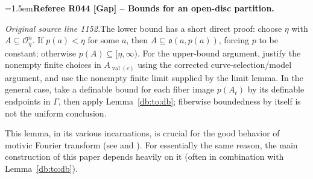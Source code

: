 \documentclass[12pt]{amsart}
\newcommand{\RefereeRemark}[4]{%
  \par\medskip\begingroup\normalfont\small\color{RefereePurple}%
  \emergencystretch=1.5em\noindent\textbf{Referee R#1 [#2] -- #3.}\par\nobreak\noindent #4\par
  \endgroup\medskip
}
\theoremstyle{plain}
\theoremstyle{definition}
\theoremstyle{remark}
\numberwithin{equation}{section}
\theoremstyle{plain}
\newcommand{\OO}{\mdl O}
\newcommand{\go}{\mathfrak{o}}
\newcommand{\0}{\emptyset}
\newcommand{\mdl}[1]{\mathcal{#1}}  %
\DeclareMathOperator{\vv}{val}
\begin{document}
\RefereeRemark{044}{Gap}{Bounds for an open-disc partition}{%
\textit{Original source line 1152.}\quad The lower bound has a short direct proof: choose $\eta$ with $A\subseteq\OO_\eta^n$. If $p(a)<\eta$ for some $a$, then $A\subseteq\go(a,p(a))$, forcing $p$ to be constant; otherwise $p(A)\subseteq[\eta,\infty)$. For the upper-bound argument, justify the nonempty finite choices in $A_{\vv(c)}$ using the corrected curve-selection/model argument, and use the nonempty finite limit supplied by the limit lemma. In the general case, take a definable bound for each fiber image $p(A_t)$ by its definable endpoints in $\Gamma$, then apply Lemma~\ref{db:to:db}; fiberwise boundedness by itself is not the uniform conclusion.
}

This lemma, in its various incarnations, is crucial for the good behavior of motivic Fourier transform (see \cite[\S~11]{hrushovski:kazhdan:integration:vf} and \cite{yin:hk:part:3}). For essentially the same reason, the  main construction of this paper depends heavily on  it (often in combination with Lemma~\ref{db:to:db}).
\end{document}
